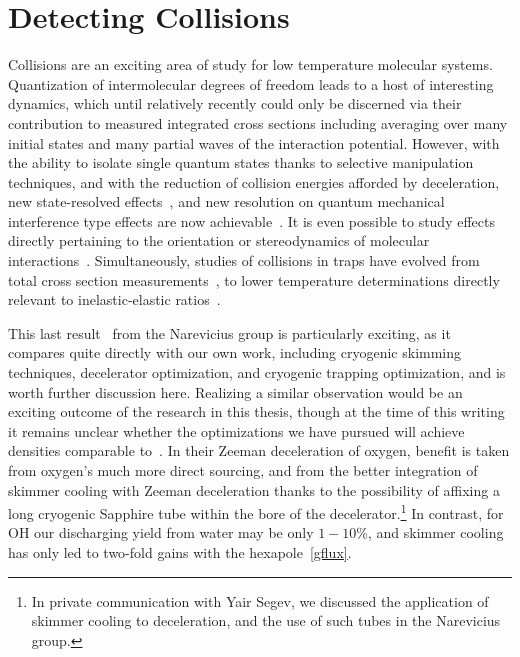 \ifx\justbeingincluded\undefined


\fi

\chapter{Detecting Collisions}
\label{chapter:collisions}


Collisions are an exciting area of study for low temperature molecular systems. 
Quantization of intermolecular degrees of freedom leads to a host of interesting dynamics, which until relatively recently could only be discerned via their contribution to measured integrated cross sections including averaging over many initial states and many partial waves of the interaction potential.
However, with the ability to isolate single quantum states thanks to selective manipulation techniques, and with the reduction of collision energies afforded by deceleration, new state-resolved effects~\cite{Greenberg2018}, and new resolution on quantum mechanical interference type effects are now achievable~\cite{Zastrow2014,Klein2016}.
It is even possible to study effects directly pertaining to the orientation or stereodynamics of molecular interactions~\cite{Perreault2017}.
Simultaneously, studies of collisions in traps have evolved from total cross section measurements~\cite{Sawyer2008,Wiederkehr2012}, to lower temperature determinations directly relevant to inelastic-elastic ratios~\cite{Marx2015,Wu2017,Segev2019}.

This last result~\cite{Segev2019} from the Narevicius group is particularly exciting, as it compares quite directly with our own work, including cryogenic skimming techniques, decelerator optimization, and cryogenic trapping optimization, and is worth further discussion here.
Realizing a similar observation would be an exciting outcome of the research in this thesis, though at the time of this writing it remains unclear whether the optimizations we have pursued will achieve densities comparable to~\cite{Segev2019}. 
In their Zeeman deceleration of oxygen, benefit is taken from oxygen's much more direct sourcing, and from the better integration of skimmer cooling with Zeeman deceleration thanks to the possibility of affixing a long cryogenic Sapphire tube within the bore of the decelerator.\footnote{In private communication with Yair Segev, we discussed the application of skimmer cooling to deceleration, and the use of such tubes in the Narevicius group.}
In contrast, for OH our discharging yield from water may be only $1-10$\%, and skimmer cooling has only led to two-fold gains with the hexapole~\ref{gflux}.

